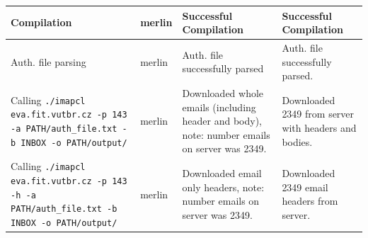 \documentclass[a4paper,11pt]{article}
\begin{document}
\begin{center}
\begin{tabularx}{\textwidth}{|>{\raggedright\arraybackslash}p{5cm}|>{\raggedright\arraybackslash}p{1cm}|>{\raggedright\arraybackslash}p{5cm}|>{\raggedright\arraybackslash}X|}
        Compilation & merlin & Successful Compilation & Successful Compilation \\
        \hline
        Auth. file parsing & merlin & Auth. file successfully parsed & Auth. file successfully parsed. \\
        \hline
        Calling \texttt{./imapcl eva.fit.vutbr.cz -p 143 -a PATH/auth\_file.txt -b INBOX -o PATH/output/} & merlin & Downloaded whole emails (including header and body), note: number emails on server was 2349. & Downloaded 2349 from server with headers and bodies. \\
        \hline
        Calling \texttt{./imapcl eva.fit.vutbr.cz -p 143 -h -a PATH/auth\_file.txt -b INBOX -o PATH/output/} & merlin & Downloaded email only headers, note: number emails on server was 2349. & Downloaded 2349 email headers from server. \\
        \hline
    \end{tabularx}
    \vspace{0.5cm} %
\end{center}
\end{document}
